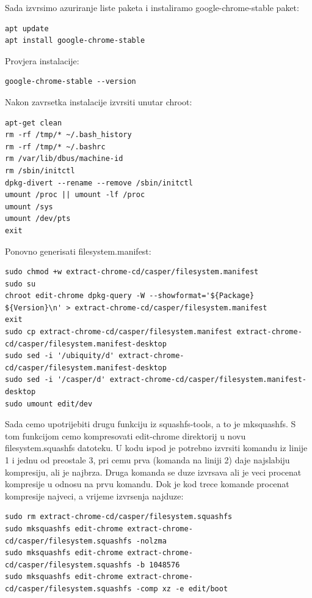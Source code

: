 \documentclass[12pt,vi]{mitthesis}
\begin{document}
Sada izvrsimo azuriranje liste paketa i instaliramo google-chrome-stable paket:
\begin{lstlisting}[style=BashInputStyle]
apt update
apt install google-chrome-stable
\end{lstlisting}

Provjera instalacije:
\begin{lstlisting}[style=BashInputStyle]
google-chrome-stable --version
\end{lstlisting}

\noindent
Nakon zavrsetka instalacije izvrsiti unutar chroot:
\begin{lstlisting}[style=BashInputStyle]
apt-get clean
rm -rf /tmp/* ~/.bash_history
rm -rf /tmp/* ~/.bashrc
rm /var/lib/dbus/machine-id
rm /sbin/initctl
dpkg-divert --rename --remove /sbin/initctl
umount /proc || umount -lf /proc
umount /sys
umount /dev/pts
exit
\end{lstlisting}

\noindent
Ponovno generisati filesystem.manifest:
\begin{lstlisting}[style=BashInputStyle]
sudo chmod +w extract-chrome-cd/casper/filesystem.manifest
sudo su
chroot edit-chrome dpkg-query -W --showformat='${Package} ${Version}\n' > extract-chrome-cd/casper/filesystem.manifest
exit
sudo cp extract-chrome-cd/casper/filesystem.manifest extract-chrome-cd/casper/filesystem.manifest-desktop
sudo sed -i '/ubiquity/d' extract-chrome-cd/casper/filesystem.manifest-desktop
sudo sed -i '/casper/d' extract-chrome-cd/casper/filesystem.manifest-desktop
sudo umount edit/dev
\end{lstlisting}

\noindent
Sada cemo upotrijebiti drugu funkciju iz squashfs-tools, a to je mksquashfs. S tom funkcijom cemo kompresovati edit-chrome direktorij u novu filesystem.squashfs datoteku. U kodu ispod je potrebno izvrsiti komandu iz linije 1 i jednu od preostale 3, pri cemu prva (komanda na liniji 2) daje najslabiju kompresiju, ali je najbrza. Druga komanda se duze izvrsava ali je veci procenat kompresije u odnosu na prvu komandu. Dok je kod trece komande procenat kompresije najveci, a vrijeme izvrsenja najduze:
\begin{lstlisting}[style=BashInputStyle]
sudo rm extract-chrome-cd/casper/filesystem.squashfs
sudo mksquashfs edit-chrome extract-chrome-cd/casper/filesystem.squashfs -nolzma 
sudo mksquashfs edit-chrome extract-chrome-cd/casper/filesystem.squashfs -b 1048576
sudo mksquashfs edit-chrome extract-chrome-cd/casper/filesystem.squashfs -comp xz -e edit/boot
\end{lstlisting}
\end{document}

